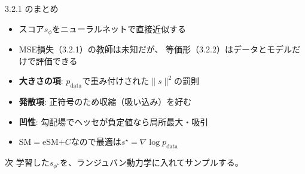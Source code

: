\asmain
\begin{frame}{3.2.1 のまとめ}
    \begin{itemize}
        \item スコア$s_\phi$をニューラルネットで直接近似する
        \item MSE損失（3.2.1）の教師は未知だが、
        等価形（3.2.2）はデータとモデルだけで評価できる
        \item \textbf{大きさの項}: $p_{\mathrm{data}}$で重み付けされた$\|s\|^2$の罰則
        \item \textbf{発散項}: 正符号のため収縮（吸い込み）を好む
        \item \textbf{凹性}: 勾配場でヘッセが負定値なら局所最大・吸引
        \item SM$=$eSM$+C$なので最適は$s^\star=\nabla\log p_{\mathrm{data}}$
    \end{itemize}
    \begin{block}{次}
        学習した$s_{\phi^\star}$を、ランジュバン動力学に入れてサンプルする。
    \end{block}
\end{frame}
